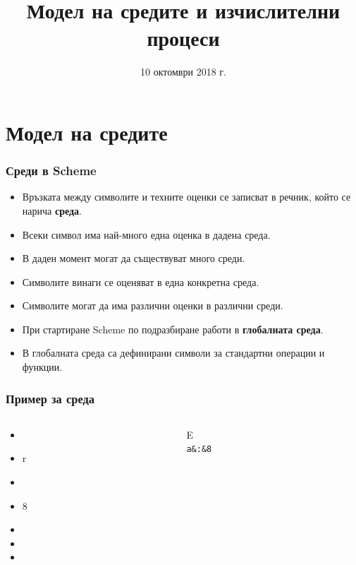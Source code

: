 \documentclass{beamer}
\title[Среди и процеси]{Модел на средите и изчислителни процеси}
\date{10 октомври 2018 г.}
\begin{document}
\begin{frame}
  \titlepage
\end{frame}

\section{Модел на средите}

\begin{frame}
  \frametitle{Среди в Scheme}

  \begin{itemize}[<+->]
  \item Връзката между символите и техните оценки се записват в речник, който се нарича \textbf{среда}.
  \item Всеки символ има най-много една оценка в дадена среда.
  \item В даден момент могат да съществуват много среди.
  \item Символите винаги се оценяват в една конкретна среда.
  \item \alert{Символите могат да има различни оценки в различни среди.}
  \item При стартиране Scheme по подразбиране работи в \textbf{глобалната среда}.
  \item В глобалната среда са дефинирани символи за стандартни операции и функции.
  \end{itemize}
\end{frame}

\begin{frame}
  \frametitle{Пример за среда}

  \begin{columns}[T,onlytextwidth]
    \begin{column}{.5\textwidth}
      \begin{itemize}[<+->]
      \item {}
      \item \evalstoerr r
      \item {}
      \item {}8
      \item {}
      \item {}
      \item {}
      \end{itemize}
    \end{column}

    \begin{column}{.5\textwidth}
      \begin{envir}{E}
        \\\firstinenv \tt a&:&8
      \end{envir}
    \end{column}
  \end{columns}
\end{frame}
\end{document}
